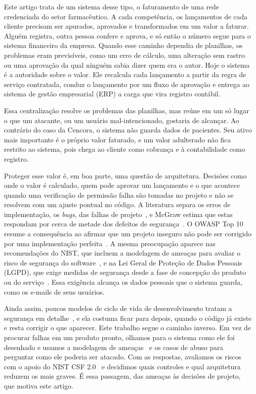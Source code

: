 \documentclass[conference]{IEEEtran}
\begin{document}
Este artigo trata de um sistema desse tipo, o faturamento de uma rede credenciada do setor farmacêutico. A cada competência, os lançamentos de cada cliente precisam ser apurados, aprovados e transformados em um valor a faturar. Alguém registra, outra pessoa confere e aprova, e só então o número segue para o sistema financeiro da empresa. Quando esse caminho dependia de planilhas, os problemas eram previsíveis, como um erro de cálculo, uma alteração sem rastro ou uma aprovação da qual ninguém sabia dizer quem era o autor. Hoje o sistema é a autoridade sobre o valor. Ele recalcula cada lançamento a partir da regra de serviço contratada, conduz o lançamento por um fluxo de aprovação e entrega ao sistema de gestão empresarial (ERP) a carga que vira registro contábil.

Essa centralização resolve os problemas das planilhas, mas reúne em um só lugar o que um atacante, ou um usuário mal-intencionado, gostaria de alcançar. Ao contrário do caso da Cencora, o sistema não guarda dados de pacientes. Seu ativo mais importante é o próprio valor faturado, e um valor adulterado não fica restrito ao sistema, pois chega ao cliente como cobrança e à contabilidade como registro.

Proteger esse valor é, em boa parte, uma questão de arquitetura. Decisões como onde o valor é calculado, quem pode aprovar um lançamento e o que acontece quando uma verificação de permissão falha são tomadas no projeto e não se resolvem com um ajuste pontual no código. A literatura separa os erros de implementação, os \textit{bugs}, das falhas de projeto~\cite{arce2014}, e McGraw estima que estas respondam por cerca de metade dos defeitos de segurança~\cite{mcgraw2006}. O OWASP Top 10 resume a consequência ao afirmar que um projeto inseguro não pode ser corrigido por uma implementação perfeita~\cite{owasp2025a06}. A mesma preocupação aparece nas recomendações do NIST, que incluem a modelagem de ameaças para avaliar o risco de segurança do software~\cite{nist2022ssdf}, e na Lei Geral de Proteção de Dados Pessoais (LGPD), que exige medidas de segurança desde a fase de concepção do produto ou do serviço~\cite{lgpd2018}. Essa exigência alcança os dados pessoais que o sistema guarda, como os e-mails de seus usuários.

Ainda assim, poucos modelos de ciclo de vida de desenvolvimento tratam a segurança em detalhe~\cite{nist2022ssdf}, e ela costuma ficar para depois, quando o código já existe e resta corrigir o que aparecer. Este trabalho segue o caminho inverso. Em vez de procurar falhas em um produto pronto, olhamos para o sistema como ele foi desenhado e usamos a modelagem de ameaças~\cite{shostack2014} e os casos de abuso para perguntar como ele poderia ser atacado. Com as respostas, avaliamos os riscos com o apoio do NIST CSF 2.0~\cite{nist2024csf} e decidimos quais controles e qual arquitetura reduzem os mais graves. É essa passagem, das ameaças às decisões de projeto, que motiva este artigo.
\end{document}
